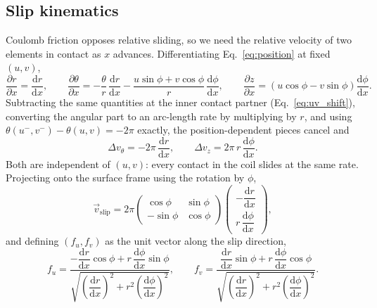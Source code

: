 \documentclass[11pt]{article}
\begin{document}
\subsection{Slip kinematics}\label{sec:slip}
Coulomb friction opposes relative sliding, so we need the relative velocity of
two elements in contact as $x$ advances. Differentiating
Eq.~\eqref{eq:position} at fixed $(u,v)$,
\begin{equation}\label{eq:dpdx}
    \frac{\partial r}{\partial x} = \frac{\mathrm d r}{\mathrm d x},
    \qquad
    \frac{\partial \theta}{\partial x}
      = -\frac{\theta}{r}\,\frac{\mathrm d r}{\mathrm d x}
        - \frac{u\sin\phi + v\cos\phi}{r}\,
          \frac{\mathrm d \phi}{\mathrm d x},
    \qquad
    \frac{\partial z}{\partial x}
      = \left(u\cos\phi - v\sin\phi\right)
        \frac{\mathrm d \phi}{\mathrm d x}.
\end{equation}
Subtracting the same quantities at the inner contact partner
(Eq.~\ref{eq:uv_shift}), converting the angular part to an arc-length rate by
multiplying by $r$, and using $\theta(u^{-},v^{-}) - \theta(u,v) = -2\pi$
exactly, the position-dependent pieces cancel and
\begin{equation}\label{eq:slip_components}
    \Delta v_\theta = -2\pi\,\frac{\mathrm d r}{\mathrm d x},
    \qquad
    \Delta v_z = 2\pi\,r\,\frac{\mathrm d \phi}{\mathrm d x}.
\end{equation}
Both are independent of $(u,v)$: every contact in the coil slides at the same
rate. Projecting onto the surface frame using the rotation by $\phi$,
\begin{equation}\label{eq:vslip}
    \vec v_{\mathrm{slip}} = 2\pi
    \begin{pmatrix} \cos\phi & \sin\phi \\ -\sin\phi & \cos\phi \end{pmatrix}
    \begin{pmatrix}
      -\dfrac{\mathrm d r}{\mathrm d x} \\[8pt]
      r\,\dfrac{\mathrm d \phi}{\mathrm d x}
    \end{pmatrix},
\end{equation}
and defining $(f_u, f_v)$ as the unit vector along the slip direction,
\begin{equation}\label{eq:friction_direction}
    f_u = \frac{-\dfrac{\mathrm d r}{\mathrm d x}\cos\phi
      + r\,\dfrac{\mathrm d \phi}{\mathrm d x}\sin\phi}
      {\sqrt{\left(\dfrac{\mathrm d r}{\mathrm d x}\right)^{2}
        + r^{2}\left(\dfrac{\mathrm d \phi}{\mathrm d x}\right)^{2}}},
    \qquad
    f_v = \frac{\dfrac{\mathrm d r}{\mathrm d x}\sin\phi
      + r\,\dfrac{\mathrm d \phi}{\mathrm d x}\cos\phi}
      {\sqrt{\left(\dfrac{\mathrm d r}{\mathrm d x}\right)^{2}
        + r^{2}\left(\dfrac{\mathrm d \phi}{\mathrm d x}\right)^{2}}}.
\end{equation}
\end{document}
